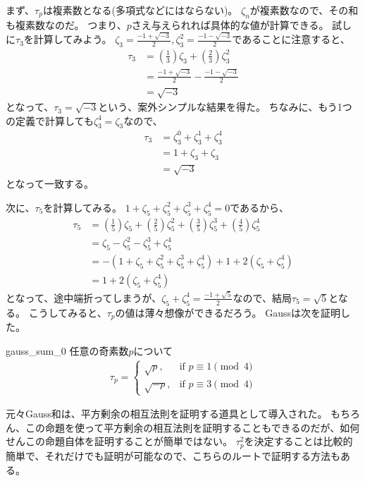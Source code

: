 まず、$\tau_p$は複素数となる(多項式などにはならない)。
$\zeta_n$が複素数なので、その和も複素数なのだ。
つまり、$p$さえ与えられれば具体的な値が計算できる。
試しに$\tau_3$を計算してみよう。
$\zeta_3=\frac{-1+\sqrt{-3}}{2}, \zeta_3^2=\frac{-1-\sqrt{-3}}{2}$であることに注意すると、
\begin{align*}
\tau_3 &= \left(\frac{1}{3}\right)\zeta_3 + \left(\frac{2}{3}\right)\zeta_3^2\\
&=\frac{-1+\sqrt{-3}}{2}-\frac{-1-\sqrt{-3}}{2}\\
&= \sqrt{-3}
\end{align*}
となって、$\tau_3=\sqrt{-3}$という、案外シンプルな結果を得た。
ちなみに、もう1つの定義で計算しても$\zeta_3^4=\zeta_3$なので、
\begin{align*}
\tau_3 &= \zeta_3^0 + \zeta_3^1 + \zeta_3^4\\
&= 1 + \zeta_3 + \zeta_3\\
&= \sqrt{-3}
\end{align*}
となって一致する。

次に、$\tau_5$を計算してみる。
$1+\zeta_5+\zeta_5^2+\zeta_5^3+\zeta_5^4=0$であるから、
\begin{align*}
\tau_5 &= \left(\frac{1}{5}\right)\zeta_5 + \left(\frac{2}{5}\right)\zeta_5^2 + \left(\frac{3}{5}\right)\zeta_5^3 + \left(\frac{4}{5}\right)\zeta_5^4\\
&= \zeta_5-\zeta_5^2-\zeta_5^3+\zeta_5^4\\
&= -(1+\zeta_5+\zeta_5^2+\zeta_5^3+\zeta_5^4)+1+2(\zeta_5+\zeta_5^4)\\
&= 1+2(\zeta_5+\zeta_5^4)
\end{align*}
となって、途中端折ってしまうが、$\zeta_5+\zeta_5^4=\frac{-1+\sqrt{5}}{2}$なので、結局$\tau_5=\sqrt{5}$となる。
こうしてみると、$\tau_p$の値は薄々想像ができるだろう。
Gaussは次を証明した。

\begin{Prop}{}{gauss_sum_0}
任意の奇素数$p$について
\begin{align*}
\tau_p = 
\begin{cases}
\sqrt{p}, &\mbox{if } p \equiv 1 \pmod{4}\\
\sqrt{-p}, &\mbox{if } p \equiv 3 \pmod{4}
\end{cases}
\end{align*}
\end{Prop}

元々Gauss和は、平方剰余の相互法則を証明する道具として導入された。
もちろん、この命題を使って平方剰余の相互法則を証明することもできるのだが、如何せんこの命題自体を証明することが簡単ではない。
$\tau_p^2$を決定することは比較的簡単で、それだけでも証明が可能なので、こちらのルートで証明する方法もある。

